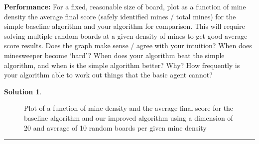 \documentclass{article}
\theoremstyle{definition}
\def\fline{\rule{0.75\linewidth}{0.5pt}}
\newcommand{\finishline}{\vspace{-15pt}\begin{center}\fline\end{center}}
\newtheorem*{solution*}{Solution}
\newenvironment{solution}{\begin{solution*}}{{\finishline} \end{solution*}}
\begin{document}
\textbf{Performance: }
For a fixed, reasonable size of board, plot as a function of mine density the average final score (safely identified mines / total mines) for the simple baseline algorithm and your algorithm for comparison. This will require solving multiple random boards at a given density of mines to get good average score results.
Does the graph make sense / agree with your intuition? When does minesweeper become ‘hard’?
When does your algorithm beat the simple algorithm, and when is the simple algorithm better? Why?
How frequently is your algorithm able to work out things that the basic agent cannot?
\begin{solution} \hfill

    \begin{figure}[H]
	\centering
	\caption{Plot of a function of mine density and the average final score for the baseline algorithm and our improved algorithm using a dimension of 20 and average of 10 random boards per given mine density}
	\end{figure}
	

\end{solution}
\end{document}
